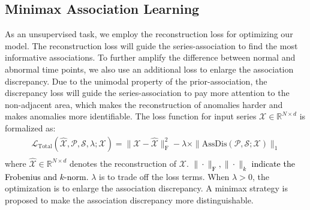 \documentclass{article} %
\newcommand{\update}[1]{{\textcolor{black}{#1}}}
\begin{document}
\subsection{Minimax Association Learning}
\vspace{-3pt}
As an unsupervised task, we employ the reconstruction loss for optimizing our model. The reconstruction loss will guide the series-association to find the most informative associations.
To further amplify the difference between normal and abnormal time points, we also use an additional loss to enlarge the association discrepancy. Due to the unimodal property of the prior-association, the discrepancy loss will guide the series-association to pay more attention to the non-adjacent area, which makes the reconstruction of anomalies harder and makes anomalies more identifiable. The loss function for input series $\mathcal{X}\in\mathbb{R}^{N\times d}$ is formalized as:
\begin{equation}\label{equ:loss}
  \begin{split}
  \mathcal{L}_{\text{Total}}({\widehat{\mathcal{X}}},\mathcal{P},\mathcal{S},\lambda;\mathcal{X})=\|\mathcal{X}-{\widehat{\mathcal{X}}}\|_{\text{F}}^2-\lambda\times \|\mathrm{AssDis}(\mathcal{P},\mathcal{S};\mathcal{X})\|_{1} \\
  \end{split}
\end{equation}
where ${\widehat{\mathcal{X}}}\in\mathbb{R}^{N\times d}$ denotes the reconstruction of $\mathcal{X}$.  \update{$\|\cdot\|_\text{F},\|\cdot\|_k$ indicate the Frobenius and $k$-norm.} $\lambda$ is to trade off the loss terms. When $\lambda>0$, the optimization is to enlarge the association discrepancy. A minimax strategy is proposed to make the association discrepancy more distinguishable.

\vspace{-5pt}
\end{document}
